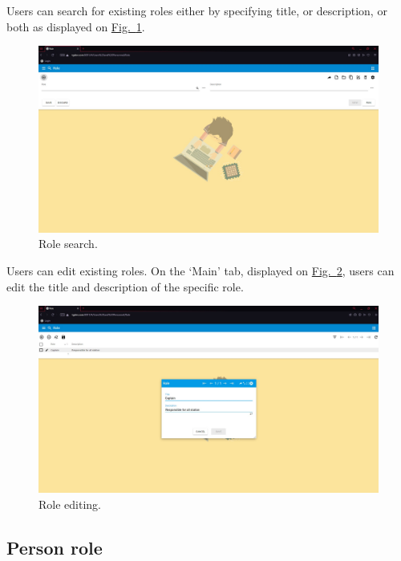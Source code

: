 \newpage
Users can search for existing roles either by specifying title, or description, or both as displayed on \hyperref[sections/personnel/images/fig4]{Fig.~\ref*{sections/personnel/images/fig4}}.

\begin{figure}[!htbp]
\centering
\includegraphics[width=0.95\linewidth]{sections/personnel/images/fig4.jpg}
\caption{Role search.}\label{sections/personnel/images/fig4}
\end{figure}

\newpage
Users can edit existing roles. On the ‘Main’ tab, displayed on \hyperref[sections/personnel/images/fig9]{Fig.~\ref*{sections/personnel/images/fig9}}, users can edit the title and description of the specific role.

\begin{figure}[!htbp]
\centering
\includegraphics[width=0.95\linewidth]{sections/personnel/images/fig9.jpg}
\caption{Role editing.}\label{sections/personnel/images/fig9}
\end{figure}

\newpage
\subsection{Person role}

